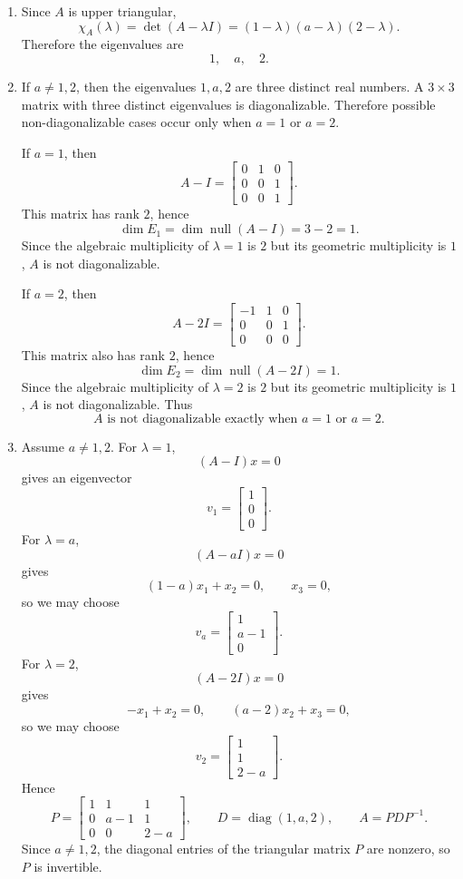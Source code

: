 \documentclass[12pt]{article}
\newcommand{\Null}{\operatorname{null}}
\newcommand{\diag}{\operatorname{diag}}
\begin{document}
\begin{enumerate}[label=(\alph*)]
  \item Since $A$ is upper triangular,
  \[
  \chi_A(\lambda)=\det(A-\lambda I)=(1-\lambda)(a-\lambda)(2-\lambda).
  \]
  Therefore the eigenvalues are
  \[
  \boxed{1,\quad a,\quad 2.}
  \]

  \item If $a\ne1,2$, then the eigenvalues $1,a,2$ are three distinct real numbers. A $3\times3$ matrix with three distinct eigenvalues is diagonalizable. Therefore possible non-diagonalizable cases occur only when $a=1$ or $a=2$.

  If $a=1$, then
  \[
  A-I=\begin{bmatrix}
  0&1&0\\
  0&0&1\\
  0&0&1
  \end{bmatrix}.
  \]
  This matrix has rank $2$, hence
  \[
  \dim E_1=\dim\Null(A-I)=3-2=1.
  \]
  Since the algebraic multiplicity of $\lambda=1$ is $2$ but its geometric multiplicity is $1$, $A$ is not diagonalizable.

  If $a=2$, then
  \[
  A-2I=\begin{bmatrix}
  -1&1&0\\
  0&0&1\\
  0&0&0
  \end{bmatrix}.
  \]
  This matrix also has rank $2$, hence
  \[
  \dim E_2=\dim\Null(A-2I)=1.
  \]
  Since the algebraic multiplicity of $\lambda=2$ is $2$ but its geometric multiplicity is $1$, $A$ is not diagonalizable. Thus
  \[
  \boxed{A\text{ is not diagonalizable exactly when }a=1\text{ or }a=2.}
  \]

  \item Assume $a\ne1,2$. For $\lambda=1$,
  \[
  (A-I)x=0
  \]
  gives an eigenvector
  \[
  v_1=\begin{bmatrix}1\\0\\0\end{bmatrix}.
  \]
  For $\lambda=a$,
  \[
  (A-aI)x=0
  \]
  gives
  \[
  (1-a)x_1+x_2=0,
  \qquad
  x_3=0,
  \]
  so we may choose
  \[
  v_a=\begin{bmatrix}1\\a-1\\0\end{bmatrix}.
  \]
  For $\lambda=2$,
  \[
  (A-2I)x=0
  \]
  gives
  \[
  -x_1+x_2=0,
  \qquad
  (a-2)x_2+x_3=0,
  \]
  so we may choose
  \[
  v_2=\begin{bmatrix}1\\1\\2-a\end{bmatrix}.
  \]
  Hence
  \[
  \boxed{
  P=\begin{bmatrix}
  1&1&1\\
  0&a-1&1\\
  0&0&2-a
  \end{bmatrix},
  \qquad
  D=\diag(1,a,2),
  \qquad
  A=PDP^{-1}.}
  \]
  Since $a\ne1,2$, the diagonal entries of the triangular matrix $P$ are nonzero, so $P$ is invertible.
\end{enumerate}
\end{document}
